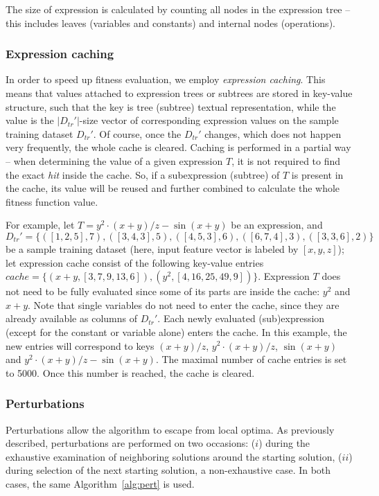 \documentclass{bmcart}
\begin{document}
The size of expression is calculated by counting all nodes in the expression tree -- this includes leaves (variables and constants) and internal nodes (operations). 

\subsubsection{Expression caching}

In order to speed up fitness evaluation, we employ \emph{expression caching}. This means that values attached to expression trees or subtrees are stored in key-value structure, such that the key is tree (subtree) textual representation, while the value is the $|D_{tr}'|$-size  vector of corresponding expression values on the sample training dataset $D_{tr}'$. Of course, once the $D_{tr}'$ changes, which does not happen very frequently, the whole cache is cleared.
Caching is performed in a partial way -- when determining the value of a given expression $T$, it is not required to find the exact \emph{hit} inside the cache. So, if a subexpression (subtree) of $T$ is present in the cache, its value will be reused and further combined to calculate the whole fitness function value. 

For example, let  $T = y^2 \cdot (x+y)/z - \sin(x+y)$ be an expression, and $D_{tr}'=\{([1, 2, 5], 7), ([3, 4, 3], 5), ([4, 5, 3], 6), ([6, 7, 4], 3), ([3, 3, 6], 2)\}$ be a sample training dataset (here, input feature vector is labeled by $[x, y, z]$); let expression cache consist of the following key-value entries $cache=\{(x+y, [3, 7, 9, 13, 6]), (y^2, [4, 16, 25, 49, 9])\}$.  
Expression $T$ does not need to be fully evaluated since some of its parts are inside the cache: $y^2$ and $x+y$. Note that single variables do not need to enter the cache, since they are already available as columns of  $D_{tr}'$.
Each newly evaluated (sub)expression (except for the constant or variable alone) enters the cache. In this example, the new entries will correspond to keys $(x+y)/z$, $y^2 \cdot (x+y)/z$, $\sin(x+y)$ and $y^2 \cdot (x+y)/z - \sin(x+y)$.  
The maximal number of cache entries is set to 5000. Once this number is reached, the cache is cleared. 

\subsubsection{Perturbations}\label{sec:pertGen}

Perturbations allow the algorithm to escape from local optima. As previously described, perturbations are performed on two occasions: ($i$) during the exhaustive examination of neighboring solutions around the starting solution, ($ii$) during selection of the next starting solution, a non-exhaustive case.  
In both cases, the same Algorithm~\ref{alg:pert} is used. 
\end{document}
